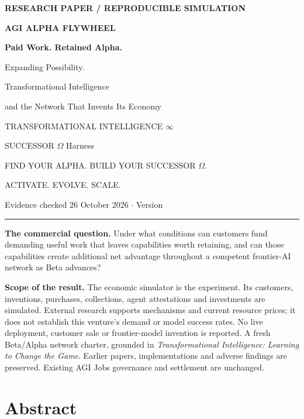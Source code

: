 \documentclass[11pt,a4paper]{article}
\newcommand{\resultbox}[1]{\begingroup\setlength{\fboxsep}{10pt}\colorbox{pale}{\begin{minipage}{\dimexpr\linewidth-20pt\relax}#1\end{minipage}}\endgroup\par}
\begin{document}
\thispagestyle{empty}
{\small\bfseries\color{accent}RESEARCH PAPER \quad / \quad REPRODUCIBLE SIMULATION}
\vspace{11mm}

{\Huge\bfseries\color{ink}AGI ALPHA FLYWHEEL\par}
\vspace{4mm}
{\LARGE\bfseries\color{accent}Paid Work. Retained Alpha.\par Expanding Possibility.\par}
\vspace{5mm}
{\large Transformational Intelligence\par and the Network That Invents Its Economy\par}
\vspace{7mm}
{\normalsize TRANSFORMATIONAL INTELLIGENCE $\infty$\par
SUCCESSOR $\Omega$ Harness\par}
{\small\color{muted}FIND YOUR ALPHA. BUILD YOUR SUCCESSOR $\Omega$.\par
ACTIVATE. EVOLVE. SCALE.\par}
\vspace{5mm}
{\small Evidence checked 26 October 2026 \quad $\cdot$ \quad Version \StudyVersion\par}
\vspace{6mm}
\rule{\linewidth}{1pt}
\vspace{4mm}
\resultbox{\textbf{The commercial question.} Under what conditions can customers fund demanding useful work that leaves capabilities worth retaining, and can those capabilities create additional net advantage throughout a competent frontier-AI network as Beta advances?\par\medskip\ResultExecutive}
\vspace{5mm}
{\small\textbf{Scope of the result.} The economic simulator is the experiment. Its customers, inventions, purchases, collections, agent attestations and investments are simulated. External research supports mechanisms and current resource prices; it does not establish this venture's demand or model success rates. No live deployment, customer sale or frontier-model invention is reported.}
\vfill
{\small\color{muted}A fresh Beta/Alpha network charter, grounded in \emph{Transformational Intelligence: Learning to Change the Game}. Earlier papers, implementations and adverse findings are preserved. Existing AGI Jobs governance and settlement are unchanged.}
\clearpage

\section*{Abstract}
\ResultAbstract
\end{document}
